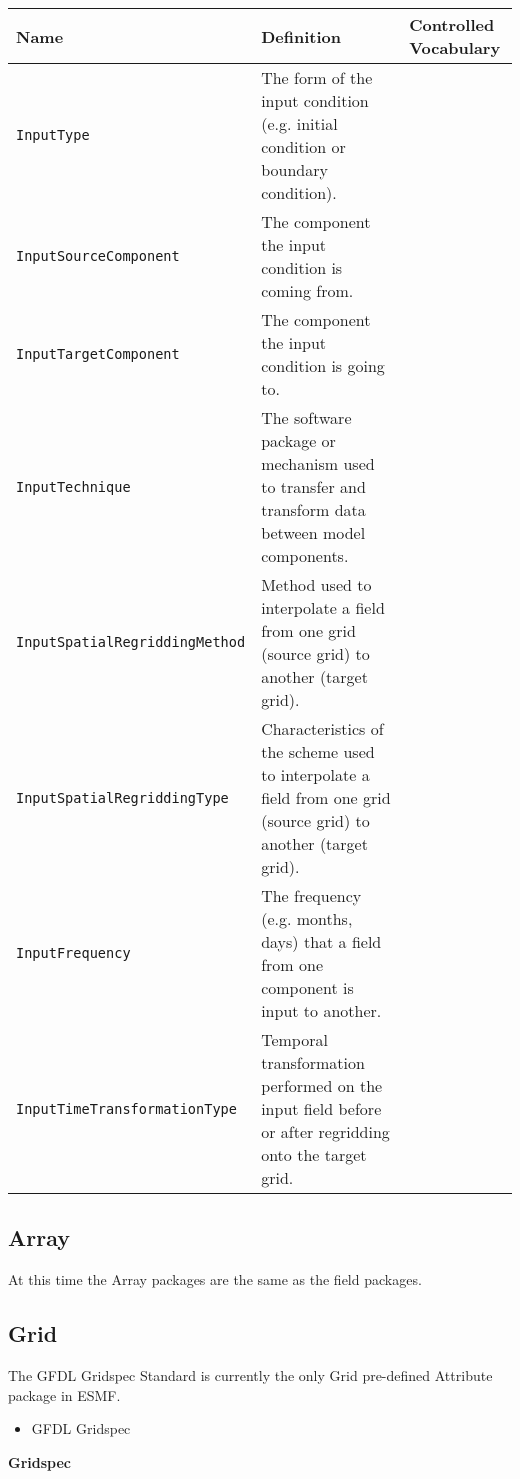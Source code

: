\begin{tabular}{|p{8cm}|p{20cm}|p{10cm}|}
    {\bf Name} & {\bf Definition} & {\bf Controlled Vocabulary} \\
    \hline\hline
    {\tt InputType} & The form of the input condition (e.g. initial condition or boundary condition). &  \\
    {\tt InputSourceComponent} & The component the input condition is coming from. & \\ 
    {\tt InputTargetComponent} & The component the input condition is going to. & \\ 
    {\tt InputTechnique} & The software package or mechanism used to transfer and transform data between model components. & \\ 
    {\tt InputSpatialRegriddingMethod} & Method used to interpolate a field from one grid (source grid) to another (target grid). & \\ 
    {\tt InputSpatialRegriddingType} & Characteristics of the scheme used to interpolate a field from one grid (source grid) to another (target grid).& \\ 
    {\tt InputFrequency} & The frequency (e.g. months, days) that a field from one component is input
 to another. & \\ 
    {\tt InputTimeTransformationType} & Temporal transformation performed on the input field before or after regridding onto the target grid.& \\ 
\end{tabular}


\subsection{Array}
\label{ArrayAttributePackages}

At this time the Array packages are the same as the field packages.



\subsection{Grid}
\label{GridAttributePackages}

The GFDL Gridspec Standard is currently the only Grid pre-defined Attribute package in ESMF.

\begin{itemize}
    \item GFDL Gridspec
\end{itemize}

{\bf Gridspec}


